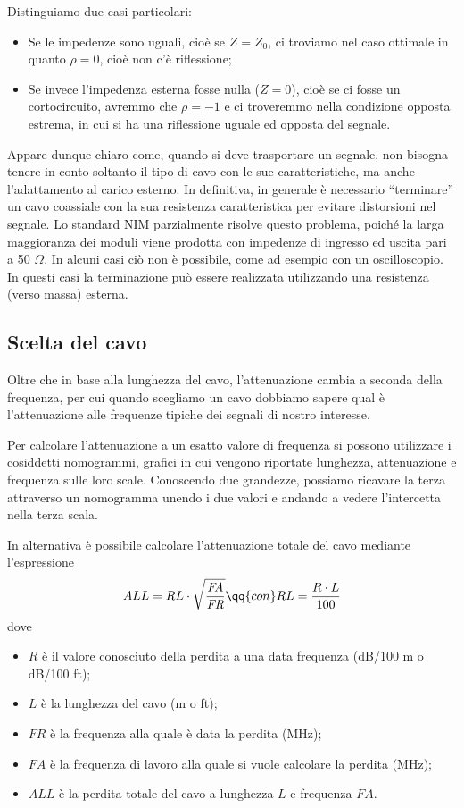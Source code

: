 Distinguiamo due casi particolari:

\begin{itemize}[leftmargin=0.5cm]
   \item Se le impedenze sono uguali, cioè se $Z=Z_0$, ci troviamo nel caso ottimale in quanto $\rho=0$, cioè non c'è riflessione;
   \item Se invece l'impedenza esterna fosse nulla ($Z=0$), cioè se ci fosse un cortocircuito, avremmo che $\rho=-1$ e ci troveremmo nella condizione opposta estrema, in cui si ha una riflessione uguale ed opposta del segnale.
\end{itemize}
Appare dunque chiaro come, quando si deve trasportare un segnale, non bisogna tenere in conto soltanto il tipo di cavo con le sue caratteristiche, ma anche l'adattamento al carico esterno. In definitiva, in generale è necessario “terminare” un cavo coassiale con la sua resistenza caratteristica per evitare distorsioni nel segnale. Lo standard NIM parzialmente risolve questo problema, poiché la larga maggioranza dei moduli viene prodotta con impedenze di ingresso ed uscita pari a 50 $\Omega$. In alcuni casi ciò non è possibile, come ad esempio con un oscilloscopio. In questi casi la terminazione può essere realizzata utilizzando una resistenza (verso massa) esterna.

\subsection{Scelta del cavo}
Oltre che in base alla lunghezza del cavo, l'attenuazione cambia a seconda della frequenza, per cui quando scegliamo un cavo dobbiamo sapere qual è l'attenuazione alle frequenze tipiche dei segnali di nostro interesse.

Per calcolare l'attenuazione a un esatto valore di frequenza si possono utilizzare i cosiddetti nomogrammi, grafici in cui vengono riportate lunghezza, attenuazione e frequenza sulle loro scale. Conoscendo due grandezze, possiamo ricavare la terza attraverso un nomogramma unendo i due valori e andando a vedere l'intercetta nella terza scala.

In alternativa è possibile calcolare l'attenuazione totale del cavo mediante l'espressione
\begin{equation*}
   ALL=RL \cdot \sqrt{\frac{\textit{FA}}{\textit{FR}}}
   \qq{con}
   RL=\frac{R \cdot L}{100}
\end{equation*}
dove
\begin{itemize}[leftmargin=0.5cm]
   \item $R$ è il valore conosciuto della perdita a una data frequenza (dB/100 m o dB/100 ft);
   \item $L$ è la lunghezza del cavo (m o ft);
   \item $\textit{FR}$ è la frequenza alla quale è data la perdita (MHz);
   \item $\textit{FA}$ è la frequenza di lavoro alla quale si vuole calcolare la perdita (MHz);
   \item $ALL$ è la perdita totale del cavo a lunghezza $L$ e frequenza $\textit{FA}$.
\end{itemize}

